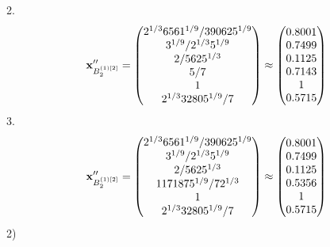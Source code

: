 \documentclass[10pt,a4paper]{article}
\begin{document}
	2.
	\[
		\bold{x}''_{B_2^{(1)[2]}} = 
		\begin{pmatrix}
			{{2^ {1 / 3}}{6561^ {1 / 9}}} / {{390625^ {1 / 9}}} \\
			{{3^ {1 / 9}}} / {{2^ {1 / 3}}{5^ {1 / 9}}} \\
			{{2}} / {{5625^ {1 / 3}}} \\
			{{5}} / {{7}} \\
			{1}{} \\
			{{2^ {1 / 3}}{32805^ {1 / 9}}} / {{7}} \\
		\end{pmatrix}
		\approx
		\begin{pmatrix}
			0.8001   \\
			0.7499   \\
			0.1125   \\
			0.7143   \\
			1        \\
			0.5715   \\
		\end{pmatrix}
	\]
	3.
	\[
		\bold{x}''_{B_2^{(1)[2]}} = 
		\begin{pmatrix}
			{{2^ {1 / 3}}{6561^ {1 / 9}}} / {{390625^ {1 / 9}}} \\
			{{3^ {1 / 9}}} / {{2^ {1 / 3}}{5^ {1 / 9}}} \\
			{{2}} / {{5625^ {1 / 3}}} \\
			{{1171875^ {1 / 9}}} / {{7}{2^ {1 / 3}}} \\
			{1}{} \\
			{{2^ {1 / 3}}{32805^ {1 / 9}}} / {{7}} \\
		\end{pmatrix}
		\approx
		\begin{pmatrix}
			0.8001   \\
			0.7499   \\
			0.1125   \\
			0.5356   \\
			1        \\
			0.5715   \\
		\end{pmatrix}
	\]
	2)
\end{document}
